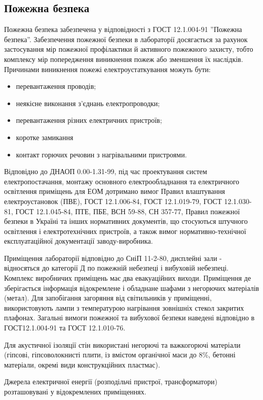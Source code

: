 \documentclass[ukrainian,utf8,simple,floatsubsection, hpadding=5mm,equationsubsection,]{eskdtext}
\begin{document}
\subsection{Пожежна безпека}
Пожежна безпека забезпечена у відповідності з ГОСТ 12.1.004-91 ”Пожежна безпека”. 
Забезпечення пожежної безпеки в 
лабораторії досягається за рахунок застосування мір пожежної профілактики 
й активного пожежного захисту, тобто комплексу мір попередження виникнення 
пожеж або зменшення їх наслідків. Причинами виникнення пожежі 
електроустаткування можуть бути:
\begin{itemize}
 \item перевантаження проводів;
 \item неякісне виконання з'єднань електропроводки;
 \item перевантаження різних електричних пристроїв;
 \item коротке замикання
 \item контакт горючих речовин з нагрівальними пристроями.
\end{itemize}

Відповідно до ДНАОП 0.00-1.31-99, під час проектування систем електропостачання, монтажу 
основного електрообладнання та електричного освітлення приміщень для ЕОМ дотримано вимог 
Правил влаштування електроустановок (ПВЕ), ГОСТ 12.1.006-84, ГОСТ 12.1.019-79, ГОСТ 12.1.030-81, 
ГОСТ 12.1.045-84, ПТЕ, ПБЕ, ВСН 59-88,  СН 357-77, Правил пожежної безпеки в Україні та 
інших нормативних документів, що стосуються штучного освітлення і електротехнічних пристроїв, 
а також вимог нормативно-технічної експлуатаційної документації заводу-виробника.

Приміщення лабораторії відповідно до СніП 11-2-80, дисплейні зали - відносяться до категорії Д 
по пожежній небезпеці і вибуховій небезпеці. Комплекс виробничих приміщень має два евакуаційних виходи.
Приміщення де зберігається інформація відокремлене і  обладнане шафами з негорючих матеріалів (метал).
Для запобігання загоряння від світильників у приміщенні, використовують лампи з температурою нагрівання зовнішніх стекол закритих плафонах.
Загальні вимоги пожежної та вибухової безпеки наведені відповідно в ГОСТ12.1.004-91 та ГОСТ 12.1.010-76.

Для акустичної ізоляції стін використані негорючі та важкогорючі матеріали (гіпсові, гіпсоволокнисті 
плити, із вмістом органічної маси до 8\%, бетонні матеріали, окремі види конструкційних пластмас).

Джерела електричної енергії (розподільчі пристрої, трансформатори) розташовувані у відокремлених приміщеннях.
\end{document}
